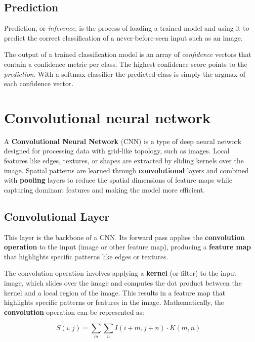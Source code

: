 \documentclass[a4paper]{report}
\begin{document}
\subsection*{Prediction}
Prediction, or \emph{inference}, is the process of loading a trained model and using it to predict the correct classification of a never-before-seen input such as an image.

The output of a trained classification model is an array of \emph{confidence} vectors that contain a confidence metric per class. The highest confidence score points to the \emph{prediction}. With a softmax classifier the predicted class is simply the $\text{argmax}$ of each confidence vector.



\section{Convolutional neural network}

A \textbf{Convolutional Neural Network} (CNN) is a type of deep neural network designed for processing data with grid-like topology, such as images. Local features like edges, textures, or shapes are extracted by sliding kernels over the image. Spatial patterns are learned through \textbf{convolutional} layers and combined with \textbf{pooling} layers to reduce the spatial dimensions of feature maps while capturing dominant features and making the model more efficient.

\subsection*{Convolutional Layer}

This layer is the backbone of a CNN. Its forward pass applies the \textbf{convolution operation} to the input (image or other feature map), producing a \textbf{feature map} that highlights specific patterns like edges or textures.

The convolution operation involves applying a \textbf{kernel} (or filter) to the input image, which slides over the image and computes the dot product between the kernel and a local region of the image. This results in a feature map that highlights specific patterns or features in the image. Mathematically, the \textbf{convolution} operation can be represented as:

\begin{equation*} S(i,j) = \sum_m \sum_n I(i+m,j+n) \cdot K(m,n) \end{equation*}
\end{document}
